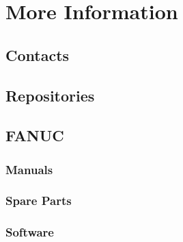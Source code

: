 \section{More Information}
\label{sec:more-info}

\subsection{Contacts}
\subsection{Repositories}
\subsection{FANUC}
    \subsubsection{Manuals}
    \subsubsection{Spare Parts}
\subsubsection{Software}
